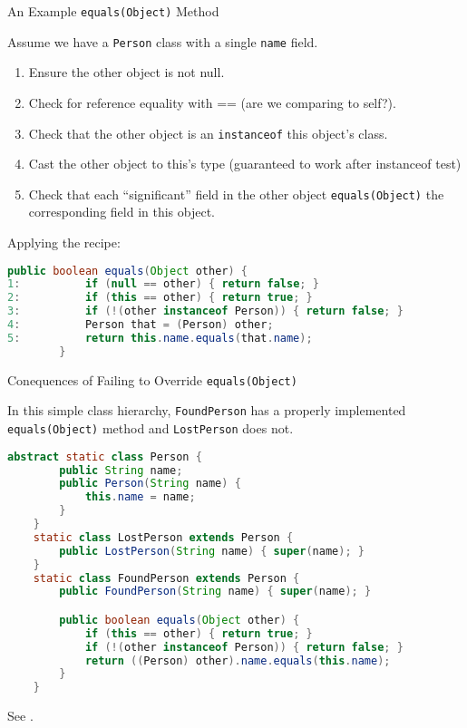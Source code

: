 \documentclass{beamer}
\begin{document}
\begin{frame}[fragile]{An Example {\tt equals(Object)} Method}

Assume we have a {\tt Person} class with a single {\tt name} field.
\begin{enumerate}
\item Ensure the other object is not null.
\item Check for reference equality with == (are we comparing to self?).
\item Check that the other object is an {\tt instanceof} this object's class.
\item Cast the other object to this's type (guaranteed to work after instanceof test)
\item Check that each ``significant'' field in the other object {\tt equals(Object)} the corresponding field in this object.
\end{enumerate}
Applying the recipe:
\begin{lstlisting}[language=Java]
        public boolean equals(Object other) {
1:          if (null == other) { return false; }
2:          if (this == other) { return true; }
3:          if (!(other instanceof Person)) { return false; }
4:          Person that = (Person) other;
5:          return this.name.equals(that.name);
        }
\end{lstlisting}

\end{frame}

\begin{frame}[fragile]{Conequences of Failing to Override {\tt equals(Object)}}

\vspace{-.05in}
In this simple class hierarchy, {\tt FoundPerson} has a properly implemented {\tt equals(Object)} method and {\tt LostPerson} does not.
\vspace{-.05in}
\begin{lstlisting}[language=Java]
    abstract static class Person {
        public String name;
        public Person(String name) {
            this.name = name;
        }
    }
    static class LostPerson extends Person {
        public LostPerson(String name) { super(name); }
    }
    static class FoundPerson extends Person {
        public FoundPerson(String name) { super(name); }

        public boolean equals(Object other) {
            if (this == other) { return true; }
            if (!(other instanceof Person)) { return false; }
            return ((Person) other).name.equals(this.name);
        }
    }
\end{lstlisting}
\vspace{-.05in}
See .

\end{frame}
\end{document}
